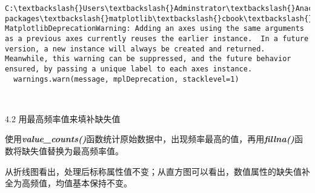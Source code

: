 \documentclass[11pt]{article}
\begin{document}
    \begin{Verbatim}[commandchars=\\\{\}]
C:\textbackslash{}Users\textbackslash{}Adminstrator\textbackslash{}Anaconda3\textbackslash{}lib\textbackslash{}site-packages\textbackslash{}matplotlib\textbackslash{}cbook\textbackslash{}deprecation.py:107: MatplotlibDeprecationWarning: Adding an axes using the same arguments as a previous axes currently reuses the earlier instance.  In a future version, a new instance will always be created and returned.  Meanwhile, this warning can be suppressed, and the future behavior ensured, by passing a unique label to each axes instance.
  warnings.warn(message, mplDeprecation, stacklevel=1)

    \end{Verbatim}

    \begin{center}
    \end{center}
    { \hspace*{\fill} \\}
    
    4.2 用最高频率值来填补缺失值

使用\textbf{\emph{value\_counts()}}函数统计原始数据中，出现频率最高的值，再用\textbf{\emph{fillna()}}函数将缺失值替换为最高频率值。

从折线图看出，处理后标称属性值不变；从直方图可以看出，数值属性的缺失值补全为高频值，均值基本保持不变。
\end{document}

